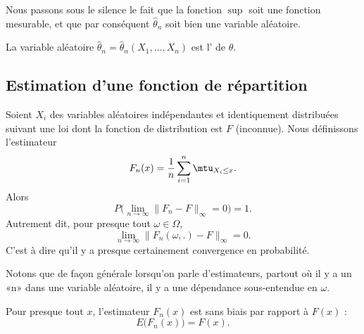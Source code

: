 \begin{remark}
    Nous passons sous le silence le fait que la fonction \( \sup\) soit une fonction mesurable, et que par conséquent \( \hat\theta_n\) soit bien une variable aléatoire.
\end{remark}

La variable aléatoire \( \hat\theta_n=\hat\theta_n(X_1,\ldots,X_n)\) est l' de \( \theta\).


\subsection{Estimation d'une fonction de répartition}

\begin{theorem}  \label{ThoXAEMbTI}
    Soient \( X_i\) des variables aléatoires indépendantes et identiquement distribuées suivant une loi dont la fonction de distribution est \( F\) (inconnue). Nous définissons l'estimateur
    \begin{equation}    \label{EqMQNRVcT}
        F_n(x)=\frac{1}{ n }\sum_{i=1}^n\mtu_{X_i\leq x}.
    \end{equation}
    Alors
    \begin{equation}
        P\big( \lim_{n\to \infty} \| F_n-F \|_{\infty}=0 \big)=1.
    \end{equation}
    Autrement dit, pour presque tout \( \omega \in \Omega\),
    \begin{equation}
        \lim_{n\to \infty} \| F_n(\omega,.)-F \|_{\infty}=0.
    \end{equation}
    C'est à dire qu'il y a presque certainement convergence en probabilité.
\end{theorem}
Notons que de façon générale lorsqu'on parle d'estimateurs, partout où il y a un «n» dans une variable aléatoire, il y a une dépendance sous-entendue en \( \omega\).

\begin{proposition} \label{PropHSHFbEq}
    Pour presque tout \( x\), l'estimateur \( F_n(x)\) est sans biais par rapport à \( F(x)\) :
    \begin{equation}
        E\big( F_n(x) \big)=F(x).
    \end{equation}
\end{proposition}

